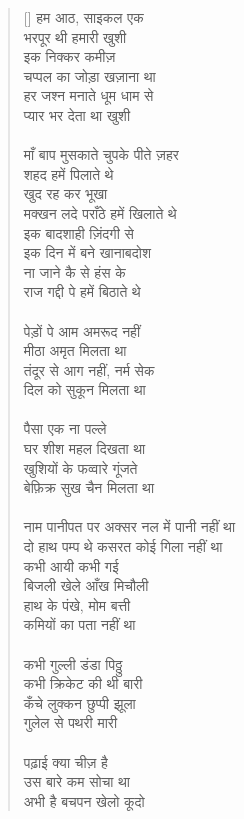 \begin{verse}[\versewidth]\texthindi{
हम आठ, साइकल एक\\
भरपूर थी हमारी खुशी\\
इक निक्कर कमीज़\\
चप्पल का जोड़ा खज़ाना था\\
हर जश्न मनाते धूम धाम से\\
प्यार भर देता था खुशी\\
\\
माँ बाप मुसकाते चुपके पीते ज़हर\\
शहद हमें पिलाते थे\\
खुद रह कर भूखा\\
मक्खन लदे पराँठे हमें खिलाते थे\\
इक बादशाही ज़िंदगी से\\
इक दिन में बने खानाबदोश\\
ना जाने कै से हंस के\\
राज गद्दी पे हमें बिठाते थे\\
\\
पेड़ों पे आम अमरूद नहीं\\
मीठा अमृत मिलता था\\
तंदूर से आग नहीं, नर्म सेक\\
दिल को सुकून मिलता था\\
\\
पैसा एक ना पल्ले\\
घर शीश महल दिखता था\\
खुशियों के फव्वारे गूंजते\\
बेफ़िक्र सुख चैन मिलता था\\
\\
नाम पानीपत पर अक्सर नल में पानी नहीं था\\
दो हाथ पम्प थे कसरत कोई गिला नहीं था\\
कभी आयी कभी गई \\
बिजली खेले आँख मिचौली\\
हाथ के पंखे, मोम बत्ती\\
कमियों का पता नहीं था\\
\\
कभी गुल्ली डंडा पिठ्ठु\\
कभी क्रिकेट की थी बारी\\
कँचे लुक्कन छुप्पी झूला\\
गुलेल से पथरी मारी\\
\\
पढ़ाई क्या चीज़ है\\
उस बारे कम सोचा था\\
अभी है बचपन खेलो कूदो\\
}
\end{verse}
